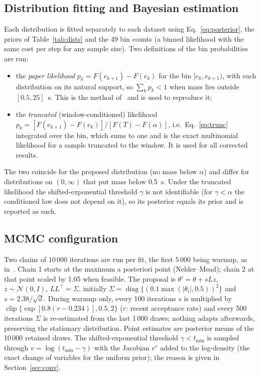 \documentclass[10pt,a4paper]{article}
\numberwithin{equation}{section}
\begin{document}
\subsection{Distribution fitting and Bayesian estimation}\label{sec:bayes}
Each distribution is fitted separately to each dataset using Eq.~\eqref{eq:posterior}, the priors of Table~\ref{tab:dists} and the 49 bin counts (a binned likelihood with the same cost per step for any sample size). Two definitions of the bin probabilities are run:
\begin{itemize}
  \item the \emph{paper likelihood} $p_k=F(e_{k+1})-F(e_k)$ for the bin $[e_k,e_{k+1})$, with each distribution on its natural support, so $\sum_kp_k<1$ when mass lies outside $[0.5,25]$~s. This is the method of~\cite{leungbootnak} and is used to reproduce it;
  \item the \emph{truncated} (window-conditioned) likelihood $p_k=[F(e_{k+1})-F(e_k)]/[F(T)-F(\alpha)]$, i.e.\ Eq.~\eqref{eq:trunc} integrated over the bin, which sums to one and is the exact multinomial likelihood for a sample truncated to the window. It is used for all corrected results.
\end{itemize}
The two coincide for the proposed distribution (no mass below $\alpha$) and differ for distributions on $(0,\infty)$ that put mass below 0.5~s. Under the truncated likelihood the shifted-exponential threshold $\gamma$ is not identifiable (for $\gamma<\alpha$ the conditioned law does not depend on it), so its posterior equals its prior and is reported as such.

\subsection{MCMC configuration}
Two chains of 10\,000 iterations are run per fit, the first 5\,000 being warmup, as in~\cite{leungbootnak}. Chain 1 starts at the maximum a posteriori point (Nelder--Mead); chain 2 at that point scaled by 1.05 when feasible.
The proposal is $\theta'=\theta+sLz$, $z\sim\mathcal N(0,I)$, $LL^\top=\Sigma$, initially $\Sigma=\operatorname{diag}\{(0.1\max(|\theta_i|,0.5))^2\}$ and $s=2.38/\sqrt d$. During warmup only, every 100 iterations $s$ is multiplied by $\operatorname{clip}\{\exp[0.8(r-0.234)],0.5,2\}$
($r$: recent acceptance rate) and every 500 iterations $\Sigma$ is re-estimated from the last 1\,000 draws; nothing adapts afterwards, preserving the stationary distribution. Point estimates are posterior means of the 10\,000 retained draws.
The shifted-exponential threshold $\gamma<t_{\min}$ is sampled through $v=\log(t_{\min}-\gamma)$ with the Jacobian $e^{v}$ added to the log-density (the exact change of variables for the uniform prior); the reason is given in Section~\ref{sec:conv}.
\end{document}
